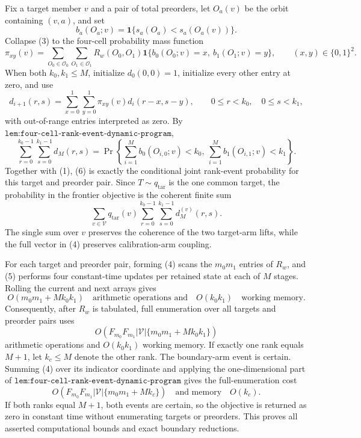 Fix a target member \(v\) and a pair of total preorders, let \(O_a(v)\) be the orbit containing \((v,a)\), and set
\[
b_a(O_a;v)=\mathbf 1\{s_a(O_a)<s_a(O_a(v))\}.
\]
Collapse (3) to the four-cell probability mass function
\[
\pi_{xy}(v)=\sum_{O_0\in\mathcal O_0}\sum_{O_1\in\mathcal O_1}R_w(O_0,O_1)\mathbf 1\{b_0(O_0;v)=x,\ b_1(O_1;v)=y\},
\qquad (x,y)\in\{0,1\}^2.
\tag{4}
\]
When both \(k_0,k_1\le M\), initialize \(d_0(0,0)=1\), initialize every other entry at zero, and use
\[
d_{i+1}(r,s)=\sum_{x=0}^1\sum_{y=0}^1\pi_{xy}(v)d_i(r-x,s-y),
\qquad 0\le r<k_0,\quad 0\le s<k_1,
\tag{5}
\]
with out-of-range entries interpreted as zero. By \(\texttt{lem:four-cell-rank-event-dynamic-program}\),
\[
\sum_{r=0}^{k_0-1}\sum_{s=0}^{k_1-1}d_M(r,s)
=\Pr\!\left\{\sum_{i=1}^M b_0(O_{i,0};v)<k_0,\ \sum_{i=1}^M b_1(O_{i,1};v)<k_1\right\}.
\tag{6}
\]
Together with (1), (6) is exactly the conditional joint rank-event probability for this target and preorder pair. Since \(T\sim q_{\mathrm{tar}}\) is the one common target, the probability in the frontier objective is the coherent finite sum
\[
\sum_{v\in\mathcal V}q_{\mathrm{tar}}(v)\sum_{r=0}^{k_0-1}\sum_{s=0}^{k_1-1}d_M^{(v)}(r,s).
\tag{7}
\]
The single sum over \(v\) preserves the coherence of the two target-arm lifts, while the full vector in (4) preserves calibration-arm coupling.

For each target and preorder pair, forming (4) scans the \(m_0m_1\) entries of \(R_w\), and (5) performs four constant-time updates per retained state at each of \(M\) stages. Rolling the current and next arrays gives
\[
O(m_0m_1+Mk_0k_1)\quad\text{arithmetic operations and}\quad O(k_0k_1)\quad\text{working memory}.
\tag{8}
\]
Consequently, after \(R_w\) is tabulated, full enumeration over all targets and preorder pairs uses
\[
O\!\left(F_{m_0}F_{m_1}|\mathcal V|\{m_0m_1+Mk_0k_1\}\right)
\tag{9}
\]
arithmetic operations and \(O(k_0k_1)\) working memory. If exactly one rank equals \(M+1\), let \(k_c\le M\) denote the other rank. The boundary-arm event is certain. Summing (4) over its indicator coordinate and applying the one-dimensional part of \(\texttt{lem:four-cell-rank-event-dynamic-program}\) gives the full-enumeration cost
\[
O\!\left(F_{m_0}F_{m_1}|\mathcal V|\{m_0m_1+Mk_c\}\right)
\quad\text{and memory}\quad O(k_c).
\tag{10}
\]
If both ranks equal \(M+1\), both events are certain, so the objective is returned as zero in constant time without enumerating targets or preorders. This proves all asserted computational bounds and exact boundary reductions.

